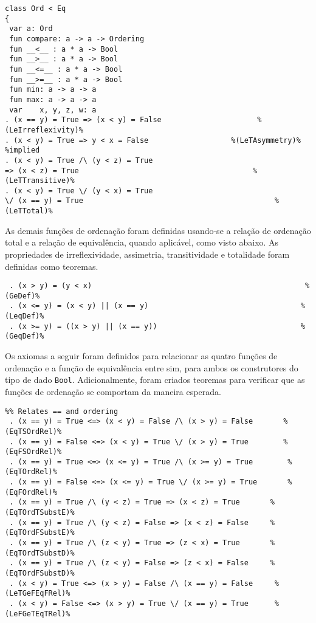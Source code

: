 \begin{Verbatim}
class Ord < Eq
{
 var a: Ord
 fun compare: a -> a -> Ordering
 fun __<__ : a * a -> Bool
 fun __>__ : a * a -> Bool
 fun __<=__ : a * a -> Bool
 fun __>=__ : a * a -> Bool
 fun min: a -> a -> a
 fun max: a -> a -> a
 var    x, y, z, w: a
. (x == y) = True => (x < y) = False                      %(LeIrreflexivity)%
. (x < y) = True => y < x = False                   %(LeTAsymmetry)% %implied
. (x < y) = True /\ (y < z) = True                 
=> (x < z) = True                                        %(LeTTransitive)%
. (x < y) = True \/ (y < x) = True                 
\/ (x == y) = True                                            %(LeTTotal)%
\end{Verbatim}

As demais funções de ordenação foram definidas usando-se a relação de ordenação total e a relação de equivalência, quando aplicável, como visto abaixo.
As propriedades de irreflexividade, assimetria, transitividade e totalidade foram definidas como teoremas.

\begin{Verbatim}
 . (x > y) = (y < x)                                                 %(GeDef)%
 . (x <= y) = (x < y) || (x == y)                                   %(LeqDef)%
 . (x >= y) = ((x > y) || (x == y))                                 %(GeqDef)%
\end{Verbatim}

Os axiomas a seguir foram definidos para relacionar as quatro funções de ordenação e a função de equivalência entre sim, para ambos os construtores do tipo de dado \Verb.Bool..
Adicionalmente, foram criados teoremas para verificar que as funções de ordenação se comportam da maneira esperada.

\begin{Verbatim}
%% Relates == and ordering
 . (x == y) = True <=> (x < y) = False /\ (x > y) = False       %(EqTSOrdRel)%
 . (x == y) = False <=> (x < y) = True \/ (x > y) = True        %(EqFSOrdRel)%
 . (x == y) = True <=> (x <= y) = True /\ (x >= y) = True        %(EqTOrdRel)%
 . (x == y) = False <=> (x <= y) = True \/ (x >= y) = True       %(EqFOrdRel)%
 . (x == y) = True /\ (y < z) = True => (x < z) = True       %(EqTOrdTSubstE)%
 . (x == y) = True /\ (y < z) = False => (x < z) = False     %(EqTOrdFSubstE)%
 . (x == y) = True /\ (z < y) = True => (z < x) = True       %(EqTOrdTSubstD)%
 . (x == y) = True /\ (z < y) = False => (z < x) = False     %(EqTOrdFSubstD)%
 . (x < y) = True <=> (x > y) = False /\ (x == y) = False     %(LeTGeFEqFRel)%
 . (x < y) = False <=> (x > y) = True \/ (x == y) = True      %(LeFGeTEqTRel)%
\end{Verbatim}


